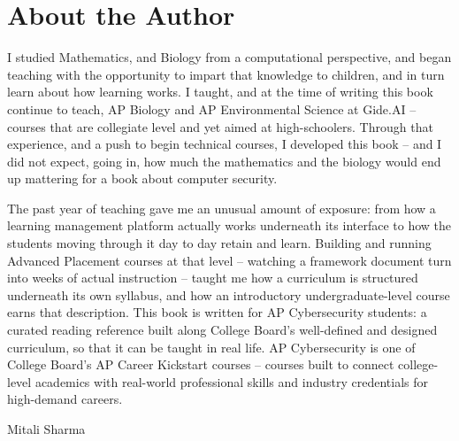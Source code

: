 \chapter*{About the Author}

I studied Mathematics, and Biology from a computational perspective, and began teaching with the opportunity to impart that knowledge to children, and in turn learn about how learning works. I taught, and at the time of writing this book continue to teach, AP Biology and AP Environmental Science at Gide.AI -- courses that are collegiate level and yet aimed at high-schoolers. Through that experience, and a push to begin technical courses, I developed this book -- and I did not expect, going in, how much the mathematics and the biology would end up mattering for a book about computer security.

The past year of teaching gave me an unusual amount of exposure: from how a learning management
platform actually works underneath its interface to how the students moving through it day to
day retain and learn. Building and running Advanced Placement courses at that level -- watching a framework document turn into weeks of actual instruction -- taught me how a curriculum is structured underneath its own syllabus, and how an introductory undergraduate-level course earns that description.
This book is written for AP Cybersecurity students: a curated reading reference built along College Board's well-defined and designed curriculum, so that it can be taught in real life. AP Cybersecurity is one of College Board's AP Career Kickstart courses -- courses built to connect college-level academics with real-world professional skills and industry credentials for high-demand careers.

\begin{flushright}
Mitali Sharma
\end{flushright}

